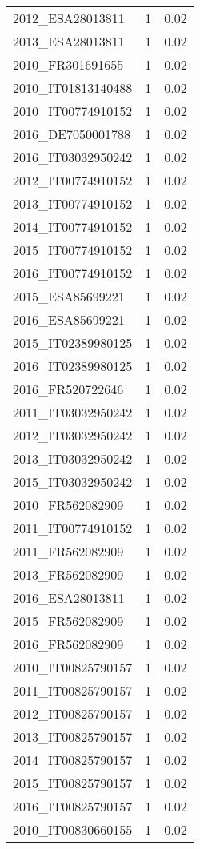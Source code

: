 \begin{table*}[htbp]
\begin{tabular}{lrr}
2012_ESA28013811 & 1 & 0.02 \\
2013_ESA28013811 & 1 & 0.02 \\
2010_FR301691655 & 1 & 0.02 \\
2010_IT01813140488 & 1 & 0.02 \\
2010_IT00774910152 & 1 & 0.02 \\
2016_DE7050001788 & 1 & 0.02 \\
2016_IT03032950242 & 1 & 0.02 \\
2012_IT00774910152 & 1 & 0.02 \\
2013_IT00774910152 & 1 & 0.02 \\
2014_IT00774910152 & 1 & 0.02 \\
2015_IT00774910152 & 1 & 0.02 \\
2016_IT00774910152 & 1 & 0.02 \\
2015_ESA85699221 & 1 & 0.02 \\
2016_ESA85699221 & 1 & 0.02 \\
2015_IT02389980125 & 1 & 0.02 \\
2016_IT02389980125 & 1 & 0.02 \\
2016_FR520722646 & 1 & 0.02 \\
2011_IT03032950242 & 1 & 0.02 \\
2012_IT03032950242 & 1 & 0.02 \\
2013_IT03032950242 & 1 & 0.02 \\
2015_IT03032950242 & 1 & 0.02 \\
2010_FR562082909 & 1 & 0.02 \\
2011_IT00774910152 & 1 & 0.02 \\
2011_FR562082909 & 1 & 0.02 \\
2013_FR562082909 & 1 & 0.02 \\
2016_ESA28013811 & 1 & 0.02 \\
2015_FR562082909 & 1 & 0.02 \\
2016_FR562082909 & 1 & 0.02 \\
2010_IT00825790157 & 1 & 0.02 \\
2011_IT00825790157 & 1 & 0.02 \\
2012_IT00825790157 & 1 & 0.02 \\
2013_IT00825790157 & 1 & 0.02 \\
2014_IT00825790157 & 1 & 0.02 \\
2015_IT00825790157 & 1 & 0.02 \\
2016_IT00825790157 & 1 & 0.02 \\
2010_IT00830660155 & 1 & 0.02 \\

\end{tabular}
\end{table*}
